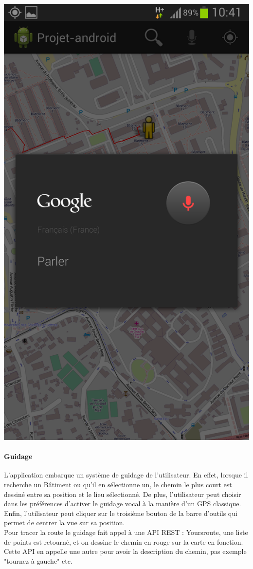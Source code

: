 \documentclass{article}
\begin{document}
	\begin{center}
		\includegraphics[scale=0.25]{recherche.png}
	\end{center}
	
	\paragraph{Guidage}
	L'application embarque un système de guidage de l'utilisateur. En effet, lorsque il recherche un Bâtiment ou qu'il en sélectionne un, le chemin le plus court est dessiné entre sa position et le lieu sélectionné. De plus, l'utilisateur peut choisir dans les préférences d'activer le guidage vocal à la manière d'un GPS classique. \\
	Enfin, l'utilisateur peut cliquer sur le troisième bouton de la barre d'outils qui permet de centrer la vue sur sa position. \\
	Pour tracer la route le guidage fait appel à une API REST : Yoursroute, une liste de points est retourné, et on dessine le chemin en rouge sur la carte en fonction. Cette API en appelle une autre pour avoir la description du chemin, pas exemple "tournez à gauche" etc.\\
	
\end{document}
